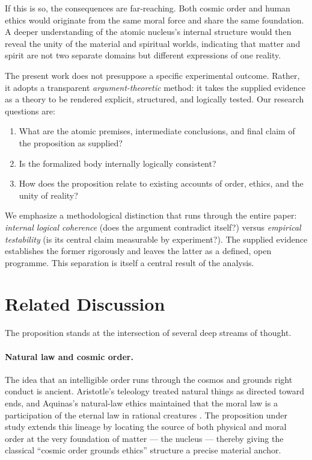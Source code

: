 \documentclass[11pt,a4paper]{article}
\begin{document}
If this is so, the consequences are far-reaching. Both cosmic order and human
ethics would originate from the same moral force and share the same
foundation. A deeper understanding of the atomic nucleus's internal structure
would then reveal the unity of the material and spiritual worlds, indicating
that matter and spirit are not two separate domains but different expressions
of one reality.

The present work does not presuppose a specific experimental outcome. Rather,
it adopts a transparent \emph{argument-theoretic} method: it takes the
supplied evidence as a theory to be rendered explicit, structured, and
logically tested. Our research questions are:
\begin{enumerate}[label=\textbf{RQ\arabic*.}, leftmargin=2.2em]
  \item What are the atomic premises, intermediate conclusions, and final
        claim of the proposition as supplied?
  \item Is the formalized body internally logically consistent?
  \item How does the proposition relate to existing accounts of order, ethics,
        and the unity of reality?
\end{enumerate}

We emphasize a methodological distinction that runs through the entire paper:
\emph{internal logical coherence} (does the argument contradict itself?)
versus \emph{empirical testability} (is its central claim measurable by
experiment?). The supplied evidence establishes the former rigorously and
leaves the latter as a defined, open programme. This separation is itself a
central result of the analysis.

\section{Related Discussion}
\label{sec:related}

The proposition stands at the intersection of several deep streams of thought.

\paragraph{Natural law and cosmic order.}
The idea that an intelligible order runs through the cosmos and grounds right
conduct is ancient. Aristotle's teleology treated natural things as directed
toward ends, and Aquinas's natural-law ethics maintained that the moral law is
a participation of the eternal law in rational creatures \cite{aquinas}. The
proposition under study extends this lineage by locating the source of both
physical and moral order at the very foundation of matter --- the nucleus ---
thereby giving the classical ``cosmic order grounds ethics'' structure a
precise material anchor.
\end{document}
